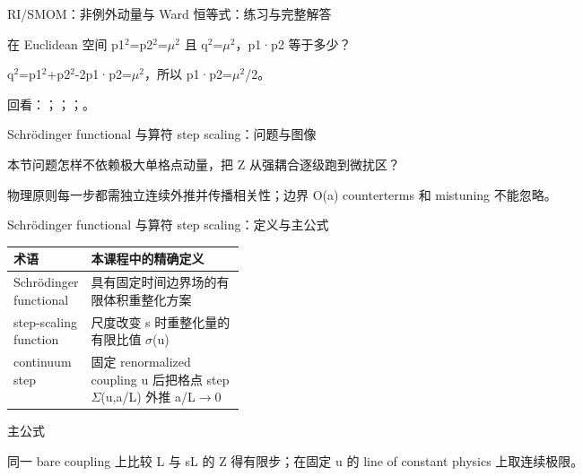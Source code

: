\begin{frame}[t]{RI/\allowbreak{}SMOM：非例外动量与 Ward 恒等式：练习与完整解答}
\footnotesize
\begin{block}{}在 Euclidean 空间 p1\ensuremath{^{2}}=p2\ensuremath{^{2}}=\ensuremath{\mu}\ensuremath{^{2}} 且 q\ensuremath{^{2}}=\ensuremath{\mu}\ensuremath{^{2}}，p1·p2 等于多少？\end{block}
\begin{exampleblock}{}q\ensuremath{^{2}}=p1\ensuremath{^{2}}+p2\ensuremath{^{2}}-2p1·p2=\ensuremath{\mu}\ensuremath{^{2}}，所以 p1·p2=\ensuremath{\mu}\ensuremath{^{2}}/\allowbreak{}2。\end{exampleblock}
\vfill
\scriptsize 回看：；；；。
\end{frame}

\begin{frame}[t]{Schrödinger functional 与算符 step scaling：问题与图像}
\footnotesize
\begin{block}{本节问题}怎样不依赖极大单格点动量，把 Z 从强耦合逐级跑到微扰区？\end{block}
\begin{block}{物理原则}\quad 每一步都需独立连续外推并传播相关性；边界 O(a) counterterms 和 mistuning 不能忽略。\end{block}
\end{frame}

\begin{frame}[t]{Schrödinger functional 与算符 step scaling：定义与主公式}
\footnotesize\begin{tabularx}{\linewidth}{p{0.30\linewidth}Y}
\toprule 术语 & 本课程中的精确定义\\\midrule
{} Schrödinger functional & 具有固定时间边界场的有限体积重整化方案\\
 step-scaling function & 尺度改变 s 时重整化量的有限比值 \ensuremath{\sigma}(u)\\
 continuum step & 固定 renormalized coupling u 后把格点 step \ensuremath{\Sigma}(u,a/\allowbreak{}L) 外推 a/\allowbreak{}L\ensuremath{\rightarrow}0\\
\bottomrule\end{tabularx}\vspace{0.15cm}
\begin{block}{ 主公式}\centering{}\end{block}
同一 bare coupling 上比较 L 与 sL 的 Z 得有限步；在固定 u 的 line of constant physics 上取连续极限。
\end{frame}

